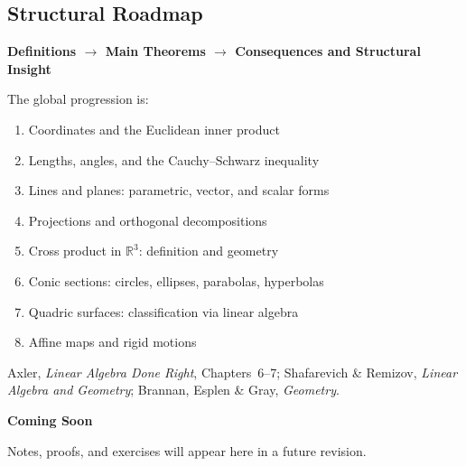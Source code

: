 \subsection*{Structural Roadmap}

\begin{center}
\textbf{Definitions $\longrightarrow$ Main Theorems
$\longrightarrow$ Consequences and Structural Insight}
\end{center}

The global progression is:

\begin{enumerate}
  \item Coordinates and the Euclidean inner product
  \item Lengths, angles, and the Cauchy--Schwarz inequality
  \item Lines and planes: parametric, vector, and scalar forms
  \item Projections and orthogonal decompositions
  \item Cross product in $\mathbb{R}^3$: definition and geometry
  \item Conic sections: circles, ellipses, parabolas, hyperbolas
  \item Quadric surfaces: classification via linear algebra
  \item Affine maps and rigid motions
\end{enumerate}

\begin{remark*}
Axler, \textit{Linear Algebra Done Right}, Chapters~6--7;
Shafarevich \& Remizov, \textit{Linear Algebra and Geometry};
Brannan, Esplen \& Gray, \textit{Geometry}.
\end{remark*}

\vspace{1em}
\begin{tcolorbox}[
  colback=gray!6, colframe=gray!40, arc=2pt,
  left=8pt, right=8pt, top=6pt, bottom=6pt,
  title={\small\textbf{Status: Planned}},
  fonttitle=\small\bfseries
]
\begin{center}\Large\bfseries Coming Soon\end{center}
\vspace{6pt}
\noindent Notes, proofs, and exercises will appear here in a future revision.
\end{tcolorbox}

% 
% 
% 
% 
% 
